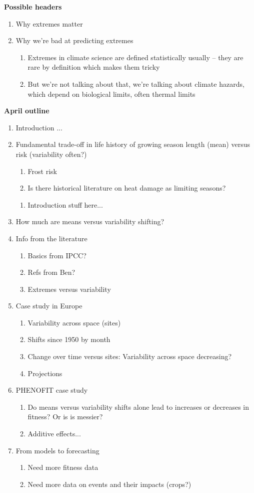 \documentclass[11pt,letter]{article}
\begin{document}
{\bf Possible headers}
\begin{enumerate}
\item Why extremes matter
\item Why we're bad at predicting extremes
\begin{enumerate}
\item Extremes in climate science are defined statistically usually -- they are rare by definition which makes them tricky
\item But we're not talking about that, we're talking about climate hazards, which depend on biological limits, often thermal limits
\end{enumerate}
\end{enumerate}

{\bf April outline}
\begin{enumerate}
\item Introduction ...
\item Fundamental trade-off in life history of growing season length (mean) versus risk (variability often?)
\begin{enumerate}
\item Frost risk
\item Is there historical literature on heat damage as limiting seasons?
\end{enumerate}
\begin{enumerate}
\item Introduction stuff here... 
\end{enumerate}
\item How much are means versus variability shifting?
\item Info from the literature
\begin{enumerate}
\item Basics from IPCC?
\item Refs from Ben?
\item Extremes versus variability
\end{enumerate}
\item Case study in Europe
\begin{enumerate}
\item Variability across space (sites)
\item Shifts since 1950 by month 
\item Change over time versus sites: Variability across space decreasing?
\item Projections
\end{enumerate}
\item PHENOFIT case study
\begin{enumerate}
\item Do means versus variability shifts alone lead to increases or decreases in fitness? Or is is messier?
\item Additive effects... 
\end{enumerate}
\item From models to forecasting
\begin{enumerate}
\item Need more fitness data
\item Need more data on events and their impacts (crops?)
\end{enumerate}
\end{enumerate}
\end{document}
